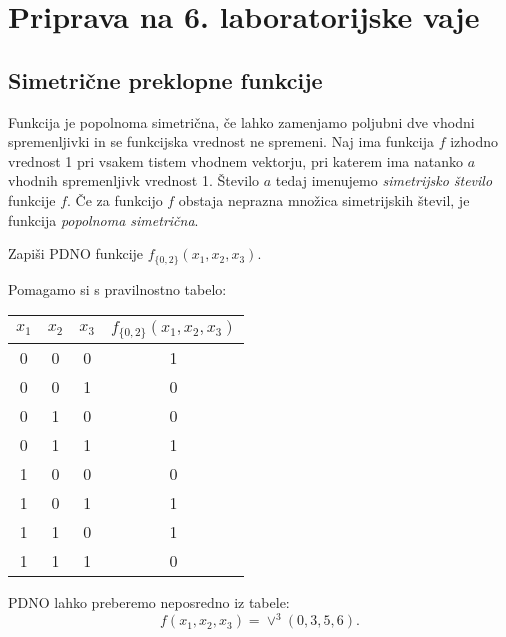 \chapter{Priprava na 6. laboratorijske vaje}
\section{Simetrične preklopne funkcije}

\bigskip
Funkcija je popolnoma simetrična, če lahko zamenjamo poljubni dve vhodni spremenljivki in se funkcijska vrednost ne spremeni. Naj ima funkcija $f$ izhodno vrednost 1 pri vsakem tistem vhodnem vektorju, pri katerem ima natanko $a$ vhodnih spremenljivk vrednost 1. Število $a$ tedaj imenujemo \textit{simetrijsko število} funkcije $f$. Če za funkcijo $f$ obstaja neprazna množica simetrijskih števil, je funkcija \textit{popolnoma simetrična}.

\bigskip
\begin{zgled} Zapiši PDNO funkcije $f_{\{0,2\}}(x_1,x_2,x_3)$.
\end{zgled}
\begin{resitev} 
Pomagamo si s pravilnostno tabelo:

\begin{tabular}{ccc|c}
$x_1$ & $x_2$ & $x_3$ & $f_{\{0,2\}}(x_1,x_2,x_3)$ \\
\hline
0 & 0 & 0 & 1 \\
0 & 0 & 1 & 0 \\
0 & 1 & 0 & 0 \\
0 & 1 & 1 & 1 \\
1 & 0 & 0 & 0 \\
1 & 0 & 1 & 1 \\
1 & 1 & 0 & 1 \\
1 & 1 & 1 & 0 \\
\end{tabular}

PDNO lahko preberemo neposredno iz tabele:
$$f(x_1,x_2,x_3) = \vee^3(0,3,5,6).$$
\end{resitev}


